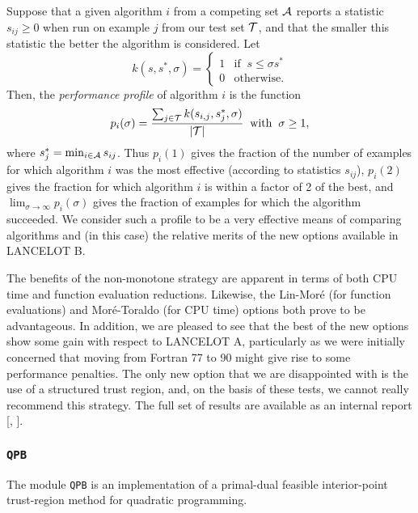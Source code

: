 \documentclass[acmtocl,acmnow]{acmtrans2m}
\newcommand{\lana}{{\sf LANCELOT A}}
\newcommand{\lanb}{{\sf LANCELOT B}}
\newcommand{\ltsubsubsection}[1]{\subsubsection{{\tt #1}} \label{#1}}
\newcommand{\bciteb}[1]{\citeauthor{#1}, \citeyear{#1}}
\newcommand{\calA}{{\cal A}} \newcommand{\calB}{{\cal B}}
\newcommand{\disp}[1]{\[{#1}\]}
\begin{document}
Suppose that a given algorithm $i$ from a competing set $\calA$
reports a statistic $s_{ij} \geq 0$
when run on example $j$ from our test set $\calT$,
and that the smaller this statistic the better the algorithm is considered.
Let
\disp{k(s,s^*,\sigma) =
 \left\{
\begin{array}{rl}
 1 & \mbox{if} \;\; s \leq \sigma s^* \\ 0 & \mbox{otherwise.}
\end{array}
\right.
}
Then, the {\em performance profile} of algorithm $i$ is the function
\disp{p_i(\sigma) = \frac{
\sum_{j \in \calT} k(s_{i,j},s^*_{j},\sigma)}{|\calT|} \;\;\mbox{with}\;\;
\sigma \geq 1,}
where $s^*_j = \min_{i \in \calA} s_{ij}$.
Thus $p_i(1)$ gives the fraction of the number of examples for which
algorithm $i$ was the most effective (according to statistics $s_{ij}$),
$p_i(2)$ gives
the fraction for which algorithm $i$
is within a factor of 2 of the best, and $\lim_{\sigma\longrightarrow\infty}
p_i(\sigma)$ gives the fraction of examples for which the algorithm
succeeded. We consider such a profile to be a very effective means
of comparing algorithms and (in this case)
the relative merits of the new options available in \lanb.

The benefits of the non-monotone strategy
are apparent in terms of both CPU time and function evaluation reductions.
Likewise, the Lin-Mor\'{e} (for function evaluations)
and Mor\'{e}-Toraldo (for CPU time) options both prove to be advantageous.
In addition, we are pleased to see that
the best of the new options show some gain with respect to
\lana, particularly as we were initially concerned that moving from
Fortran 77 to 90 might give rise to some performance penalties.
The only new option that we are disappointed with is the use of a
structured trust region, and, on the basis of these tests,
we cannot really recommend this strategy. The full set of results
are available as an internal report [\bciteb{goulorbatoin02c}].

\ltsubsubsection{QPB}

The module {\tt QPB} is an implementation of a primal-dual
feasible interior-point trust-region method for quadratic programming.
\end{document}
